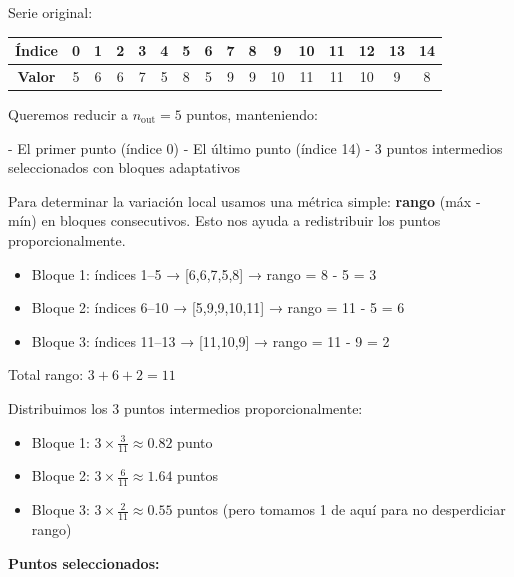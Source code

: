 Serie original:

\begin{center}
\begin{tabular}{|c|c|c|c|c|c|c|c|c|c|c|c|c|c|c|c|}
\hline
\textbf{Índice} & 0 & 1 & 2 & 3 & 4 & 5 & 6 & 7 & 8 & 9 & 10 & 11 & 12 & 13 & 14 \\
\hline
\textbf{Valor} & 5 & 6 & 6 & 7 & 5 & 8 & 5 & 9 & 9 & 10 & 11 & 11 & 10 & 9 & 8 \\
\hline
\end{tabular}
\end{center}

Queremos reducir a \(n_{\text{out}} = 5\) puntos, manteniendo:

- El primer punto (índice 0)
- El último punto (índice 14)
- 3 puntos intermedios seleccionados con bloques adaptativos

\bigskip

\noindent Para determinar la variación local usamos una métrica simple: \textbf{rango} (máx - mín) en bloques consecutivos. Esto nos ayuda a redistribuir los puntos proporcionalmente.

\begin{itemize}
    \item Bloque 1: índices 1–5 → [6,6,7,5,8] → rango = 8 - 5 = 3
    \item Bloque 2: índices 6–10 → [5,9,9,10,11] → rango = 11 - 5 = 6
    \item Bloque 3: índices 11–13 → [11,10,9] → rango = 11 - 9 = 2
\end{itemize}

Total rango: \(3 + 6 + 2 = 11\)

Distribuimos los 3 puntos intermedios proporcionalmente:

\begin{itemize}
    \item Bloque 1: \(3 \times \frac{3}{11} ≈ 0.82\)  punto
    \item Bloque 2: \(3 \times \frac{6}{11} ≈ 1.64\)  puntos
    \item Bloque 3: \(3 \times \frac{2}{11} ≈ 0.55\)  puntos (pero tomamos 1 de aquí para no desperdiciar rango)
\end{itemize}

\textbf{Puntos seleccionados:}

